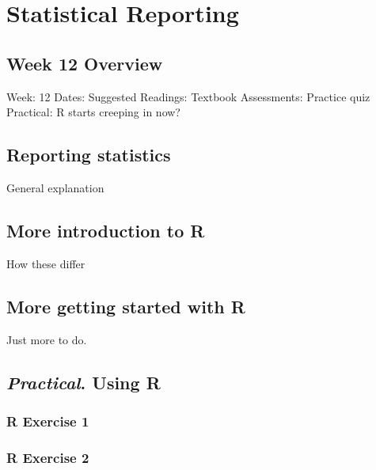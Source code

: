 \documentclass[
]{scrbook}
\begin{document}
\hypertarget{part-statistical-reporting}{%
\part{Statistical Reporting}\label{part-statistical-reporting}}

\hypertarget{Week12}{%
\chapter*{Week 12 Overview}\label{Week12}}

Week: 12
Dates:
Suggested Readings: Textbook
Assessments: Practice quiz
Practical: R starts creeping in now?

\hypertarget{reporting-statistics}{%
\chapter{Reporting statistics}\label{reporting-statistics}}

General explanation

\hypertarget{more-introduction-to-r}{%
\chapter{More introduction to R}\label{more-introduction-to-r}}

How these differ

\hypertarget{more-getting-started-with-r}{%
\chapter{More getting started with R}\label{more-getting-started-with-r}}

Just more to do.

\hypertarget{practical.-using-r-1}{%
\chapter{\texorpdfstring{\emph{Practical}. Using R}{Practical. Using R}}\label{practical.-using-r-1}}

\hypertarget{r-exercise-1-1}{%
\section{R Exercise 1}\label{r-exercise-1-1}}

\hypertarget{r-exercise-2-1}{%
\section{R Exercise 2}\label{r-exercise-2-1}}
\end{document}
